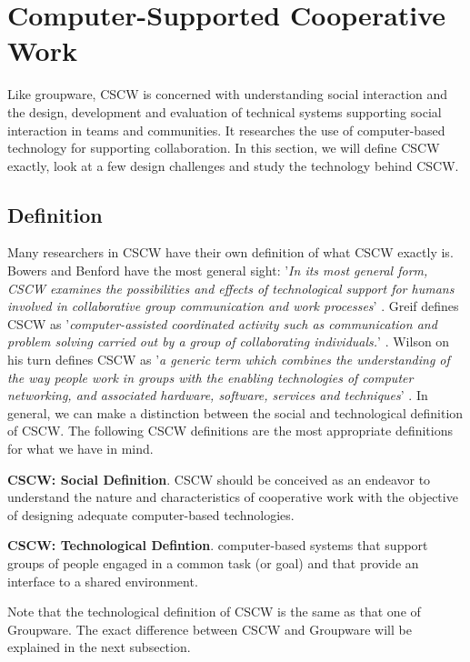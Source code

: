 \section{Computer-Supported Cooperative Work}

Like groupware, CSCW is concerned with understanding social interaction and the design, development and evaluation of technical systems supporting social interaction in teams and communities. It researches the use of computer-based technology for supporting collaboration. In this section, we will define CSCW exactly, look at a few design challenges and study the technology behind CSCW.

\subsection{Definition}

Many researchers in CSCW have their own definition of what CSCW exactly is. Bowers and Benford have the most general sight: '\textit{In its most general form, CSCW examines the possibilities and effects of technological support for humans involved in collaborative group communication and work processes}' \cite{StudyCSCW}. Greif defines CSCW as '\textit{computer-assisted coordinated activity such as communication and problem solving carried out by a group of collaborating individuals.}' \cite{CSCWReadings}. Wilson on his turn defines CSCW as '\textit{a generic term which combines the understanding of the way people work in groups with the enabling technologies of computer networking, and associated hardware, software, services and techniques}' \cite{CSCWIntro}. In general, we can make a distinction between the social and technological definition of CSCW. The following CSCW definitions are the most appropriate definitions for what we have in mind.
\begin{mydef}
\textbf{CSCW: Social Definition}. CSCW should be conceived as an endeavor to understand the nature and characteristics of cooperative work with the objective of designing adequate computer-based technologies. \cite{CSCWChars}
\end{mydef}
\begin{mydef}
\textbf{CSCW: Technological Defintion}. computer-based systems that support groups of people engaged in a common task (or goal) and that provide an interface to a shared environment. \cite{CSCWGroupware}
\end{mydef}
Note that the technological definition of CSCW is the same as that one of Groupware. The exact difference between CSCW and Groupware will be explained in the next subsection.

